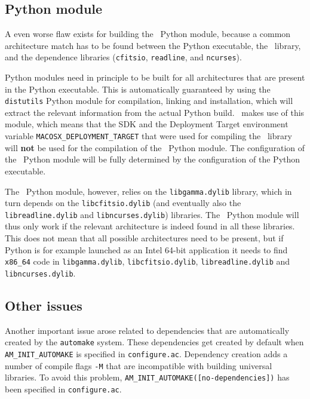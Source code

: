 \documentclass{article}[12pt,a4]
\begin{document}
\subsection{Python module}
\label{sec:python}

A even worse flaw exists for building the \this\ Python module, because a common architecture
match has to be found between the Python executable, the \this\ library, and the dependence
libraries ({\tt cfitsio}, {\tt readline}, and {\tt ncurses}).

Python modules need in principle to be built for all architectures that are present in the Python
executable.
This is automatically guaranteed by using the {\tt distutils} Python module for compilation,
linking and installation, which will extract the relevant information from the actual Python
build.
\this\ makes use of this module, which means that the SDK and the Deployment Target 
environment variable
{\tt MACOSX\_DEPLOYMENT\_TARGET}
that were used for compiling the \this\ library will {\bf not} be used for the compilation of the \this\ 
Python module.
The configuration of the \this\ Python module will be fully determined by the configuration
of the Python executable.

The \this\ Python module, however, relies on the {\tt libgamma.dylib} library, which in turn depends
on the {\tt libcfitsio.dylib} (and eventually also the {\tt libreadline.dylib} and {\tt libncurses.dylib})
libraries.
The \this\ Python module will thus only work if the relevant architecture is indeed found in all
these libraries.
This does not mean that all possible architectures need to be present, but if Python is for
example launched as an Intel 64-bit application it needs to find {\tt x86\_64} code in
{\tt libgamma.dylib}, {\tt libcfitsio.dylib}, {\tt libreadline.dylib} and {\tt libncurses.dylib}.


\subsection{Other issues}

Another important issue arose related to dependencies that are automatically created by the
{\tt automake} system.
These dependencies get created by default when
{\tt AM\_INIT\_AUTOMAKE}
is specified in {\tt configure.ac}.
Dependency creation adds a number of compile flags {\tt -M} that are incompatible with building
universal libraries.
To avoid this problem,
{\tt AM\_INIT\_AUTOMAKE([no-dependencies])}
has been specified in {\tt configure.ac}.
\end{document}
